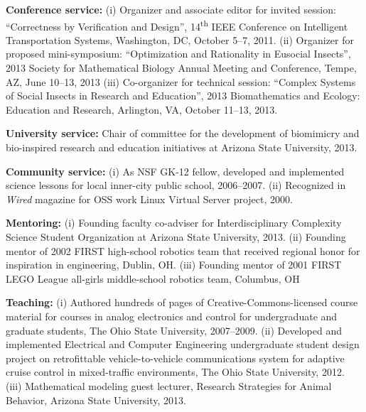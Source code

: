 \documentclass[a4paper,11pt]{article}
\begin{document}
\begin{bibenum}[itemsep=4pt]

    \item \textbf{Conference service:}
        (i) Organizer and associate editor for invited session:
        ``Correctness by Verification and Design'',
        14\textsuperscript{th} IEEE Conference on Intelligent
        Transportation Systems, Washington, DC, October
        5--7, 2011.
        (ii) Organizer for proposed mini-symposium: ``Optimization and
        Rationality in Eusocial Insects'', 2013 Society for Mathematical
        Biology Annual Meeting and Conference, Tempe, AZ,
        June 10--13, 2013
        (iii) Co-organizer for technical session: ``Complex Systems of
        Social Insects in Research and Education'', 2013 Biomathematics
        and Ecology: Education and Research, Arlington, VA,
        October 11--13, 2013.

    \item \textbf{University service:} Chair of committee for the
        development of biomimicry and bio-inspired research and education
        initiatives at Arizona State University, 2013.

    \item \textbf{Community service:}
        (i) As NSF GK-12 fellow, developed and implemented science
        lessons for local inner-city public school, 2006--2007.
        (ii) Recognized in \emph{Wired} magazine for OSS work Linux
        Virtual Server project, 2000.

    \item \textbf{Mentoring:}
        (i) Founding faculty co-adviser for Interdisciplinary Complexity
        Science Student Organization at Arizona State University, 2013.
        (ii) Founding mentor of 2002 FIRST high-school robotics team
        that received regional honor for inspiration in engineering,
        Dublin, OH.
        (iii) Founding mentor of 2001 FIRST LEGO League all-girls
        middle-school robotics team, Columbus, OH

    \item \textbf{Teaching:}
        (i) Authored hundreds of pages of Creative-Commons-licensed
        course material for courses in analog electronics and control
        for undergraduate and graduate students, The Ohio State
        University, 2007--2009.
        (ii) Developed and implemented Electrical and Computer
        Engineering undergraduate student design project on
        retrofittable vehicle-to-vehicle communications system for
        adaptive cruise control in mixed-traffic environments, The Ohio
        State University, 2012.
        (iii) Mathematical modeling guest lecturer, Research Strategies
        for Animal Behavior, Arizona State University, 2013.

\end{bibenum}
\end{document}
